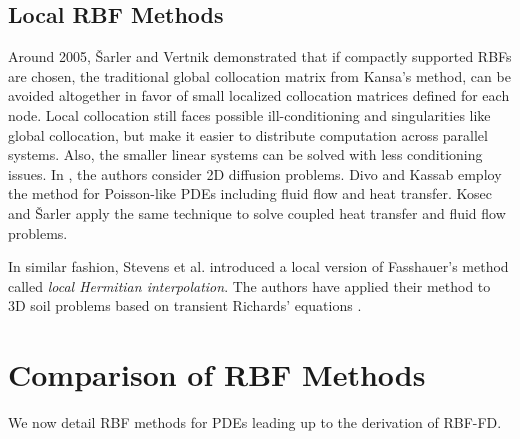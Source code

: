 \documentclass[11pt]{report}
\begin{document}
{\subsection{Local RBF Methods}
Around 2005, \v{S}arler and Vertnik \cite{Sarler2006, Vertnik2006} demonstrated that if compactly supported RBFs are chosen, the traditional global 
collocation matrix from Kansa's method, can be avoided altogether in favor of small localized collocation matrices defined for 
each node. Local collocation still faces possible ill-conditioning and singularities 
like global collocation, but make it easier to distribute computation across parallel systems. Also, the smaller linear systems can be 
solved 
with less conditioning issues. In \cite{Sarler2006}, the authors consider 2D diffusion problems. Divo and Kassab \cite{Divo2007} 
employ the 
method for Poisson-like PDEs including fluid flow and heat transfer. Kosec and \v{S}arler \cite{Kosec2008} apply the 
same technique to solve coupled heat transfer and fluid flow problems.

In similar fashion, Stevens et al. \cite{Stevens2009a} introduced a local version of 
Fasshauer's method called \emph{local Hermitian interpolation}. The authors have applied their method to 3D soil 
problems based on transient Richards' equations \cite{Stevens2008a, Stevens2009a, Stevens2009b}.



\section{Comparison of RBF Methods}

We now detail RBF methods for PDEs leading up to the derivation of RBF-FD. 

}
\end{document}
